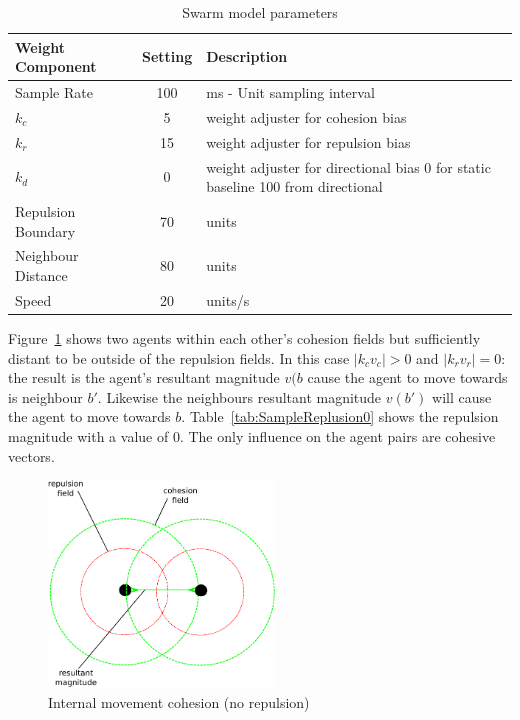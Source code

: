 \documentclass[10pt,journal,letterpaper,twoside]{IEEEtran}
\begin{document}
\begin{table}[H]
\begin{center}
\begin{tabular}{| p{2.5cm} | c | p{3cm} |}
\hline
\bf Weight \bf Component & \bf Setting & \bf Description \\ \hline
Sample Rate & 100 & ms - Unit sampling interval\\  \hline
$k_c$ & 5 & weight adjuster for cohesion bias\\  \hline
$k_r$ & 15 & weight adjuster for repulsion  bias\\  \hline
$k_d$ & 0 & weight adjuster for directional bias 0 for static baseline 100 from directional\\  \hline
Repulsion Boundary & 70 & units\\  \hline
Neighbour Distance & 80 & units\\  \hline
Speed & 20 & units/s\\  \hline
\end{tabular}\caption{Swarm model parameters} \label{tab:MetricPhysics1}
\end{center}
\end{table}

Figure~\ref{methods:Stability1} shows two agents within each other's cohesion fields but sufficiently distant to be outside of the repulsion fields. In this case $|k_cv_c| > 0$ and $|k_rv_r| = 0$: the result is the agent's resultant magnitude $v(b$  cause the agent to move towards is neighbour $b'$. Likewise the neighbours resultant magnitude $v(b')$ will cause the agent to move towards $b$. Table~\ref{tab:SampleReplusion0} shows the repulsion magnitude with a value of 0. The only influence on the agent pairs are cohesive vectors. 

\begin{figure}[H]
\begin{center}
\includegraphics[width=6cm]{figures/Stability1}
\end{center}
\caption{Internal movement cohesion (no repulsion)} \label{methods:Stability1}
\end{figure}
\end{document}
